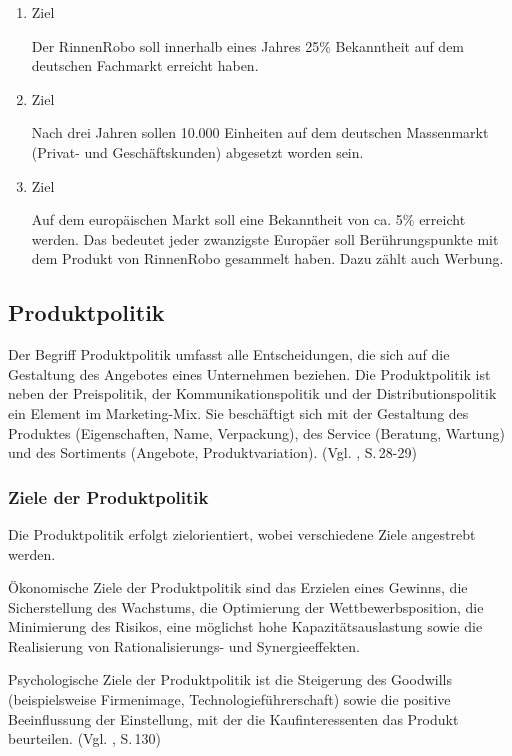     \begin{enumerate}
        \item Ziel
        
            Der RinnenRobo soll innerhalb eines Jahres 25\% Bekanntheit auf dem deutschen Fachmarkt erreicht haben.

        \item Ziel
        
            Nach drei Jahren sollen 10.000 Einheiten auf dem deutschen Massenmarkt (Privat- und Geschäftskunden)
            abgesetzt worden sein.

        \item Ziel
        
            Auf dem europäischen Markt soll eine Bekanntheit von ca. 5\% erreicht werden. Das bedeutet jeder zwanzigste
            Europäer soll Berührungspunkte mit dem Produkt von RinnenRobo gesammelt haben. Dazu zählt auch Werbung.
    \end{enumerate}


    \subsection{Produktpolitik} \label{ppoli}
    Der Begriff Produktpolitik umfasst alle Entscheidungen, die sich auf die Gestaltung des Angebotes eines Unternehmen
    beziehen. Die Produktpolitik ist neben der Preispolitik, der Kommunikationspolitik und der Distributionspolitik ein
    Element im Marketing-Mix. Sie beschäftigt sich mit der Gestaltung des Produktes (Eigenschaften, Name, Verpackung),
    des Service (Beratung, Wartung) und des Sortiments (Angebote, Produktvariation). (Vgl. \cite{Bruhn2012}, S.\,28-29)

    \subsubsection{Ziele der Produktpolitik}
        Die Produktpolitik erfolgt zielorientiert, wobei verschiedene Ziele angestrebt werden.

        Ökonomische Ziele der Produktpolitik sind das Erzielen eines Gewinns, die Sicherstellung des Wachstums, die
        Optimierung der Wettbewerbsposition, die Minimierung des Risikos, eine möglichst hohe Kapazitätsauslastung sowie
        die Realisierung von Rationalisierungs- und Synergieeffekten.

        Psychologische Ziele der Produktpolitik ist die Steigerung des Goodwills (beispielsweise Firmenimage,
        Technologieführerschaft) sowie die positive Beeinflussung der Einstellung, mit der die Kaufinteressenten das
        Produkt beurteilen. (Vgl. \cite{Bruhn2012}, S.\,130)

